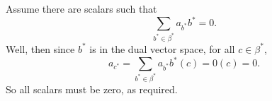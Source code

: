 Assume there are scalars such that $$\sum_{b^*\in\beta^*} a_{b^*}b^* =0.$$
Well, then since $b^*$ is in the dual vector space, for all $c\in \beta^*$, 
$$a_{c^*}=\sum_{b^*\in\beta^*} a_{b^*}b^*(c) =0(c)=0.$$
So all scalars must be zero, as required.
